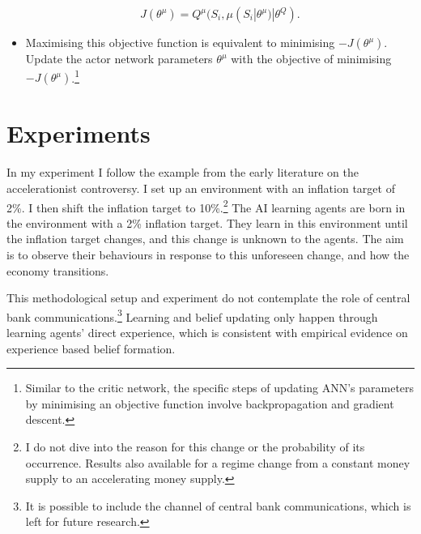 \documentclass[hidelinks]{article}
\begin{document}
\begin{itemize}
	\begin{equation}
	J(\theta^{\mu}) = Q^\mu(S_i, \mu(S_i|\theta^{\mu})|\theta^Q).
	\end{equation}
	
	\item Maximising this objective function is equivalent to minimising $-J(\theta^\mu)$. Update the actor network parameters $\theta^\mu$ with the objective of minimising $-J(\theta^\mu)$.\footnote{Similar to the critic network, the specific steps of updating ANN's parameters by minimising an objective function involve backpropagation and gradient descent.}
	
\end{itemize}

\section{Experiments} 
\label{experiments}
In my experiment I follow the example from the early literature on the accelerationist controversy. I set up an environment with an inflation target of 2\%. I then shift the inflation target to 10\%.\footnote{I do not dive into the reason for this change or the probability of its occurrence. Results also available for a regime change from a constant money supply to an accelerating money supply. } The AI learning agents are born in the environment with a 2\% inflation target. They learn in this environment until the inflation target changes, and this change is unknown to the agents. The aim is to observe their behaviours in response to this unforeseen change, and how the economy transitions. 

This methodological setup and experiment do not contemplate the role of central bank communications.\footnote{It is possible to include the channel of central bank communications, which is left for future research.} Learning and belief updating only happen through learning agents' direct experience, which is consistent with empirical evidence on experience based belief formation. 


\end{document}

